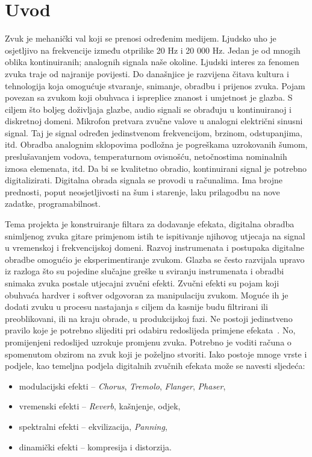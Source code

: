 \documentclass[conference]{IEEEtran}
\begin{document}
\section{Uvod}
Zvuk je mehanički val koji se prenosi određenim medijem. Ljudsko uho je osjetljivo na
frekvencije između otprilike 20 Hz i 20 000 Hz. Jedan je od mnogih oblika kontinuiranih;
analognih signala naše okoline. Ljudski interes za fenomen zvuka traje od najranije povijesti. Do
današnjice je razvijena čitava kultura i tehnologija koja omogućuje stvaranje, snimanje, obradbu
i prijenos zvuka. Pojam povezan sa zvukom koji obuhvaca i ispreplice znanost i umjetnost je glazba.
S ciljem što boljeg doživljaja glazbe, audio signali se obrađuju u kontinuiranoj i
diskretnoj domeni. Mikrofon pretvara zvučne valove u analogni električni sinusni signal. Taj je
signal određen jedinstvenom frekvencijom, brzinom, odstupanjima, itd. Obradba analognim
sklopovima podložna je pogreškama uzrokovanih šumom, preslušavanjem vodova,
temperaturnom ovisnošću, netočnostima nominalnih iznosa elemenata, itd. Da bi se kvalitetno
obradio, kontinuirani signal je potrebno digitalizirati. Digitalna obrada signala se provodi u
računalima. Ima brojne prednosti, poput neosjetljivosti na šum i starenje, laku prilagodbu na
nove zadatke, programabilnost.

Tema projekta je konstruiranje filtara za dodavanje efekata, digitalna obradba snimljenog zvuka
gitare primjenom istih te ispitivanje njihovog utjecaja na signal u vremenskoj i frekvencijskoj
domeni. Razvoj instrumenata i postupaka digitalne obradbe omogućio je eksperimentiranje
zvukom. Glazba se često razvijala upravo iz razloga što su pojedine slučajne greške u sviranju
instrumenata i obradbi snimaka zvuka postale utjecajni zvučni efekti. Zvučni efekti su pojam koji
obuhvaća hardver i softver odgovoran za manipulaciju zvukom. Moguće ih je dodati zvuku u
procesu nastajanja s ciljem da kasnije budu filtrirani ili preoblikovani, ili
na kraju obrade, u produkcijskoj fazi. Ne postoji jedinstveno pravilo koje je potrebno slijediti pri
odabiru redoslijeda primjene efekata~\cite{b1}. No, promijenjeni redoslijed uzrokuje promjenu zvuka.
Potrebno je voditi računa o spomenutom obzirom na zvuk koji je poželjno stvoriti. Iako postoje
mnoge vrste i podjele, kao temeljna podjela digitalnih zvučnih efekata
može se navesti sljedeća:

\begin{itemize}
	\item{modulacijski efekti – \textit{Chorus}, \textit{Tremolo}, \textit{Flanger}, \textit{Phaser},}
	\item{vremenski efekti – \textit{Reverb}, kašnjenje, odjek,}
	\item{spektralni efekti – ekvilizacija, \textit{Panning},}
	\item{dinamički efekti – kompresija i distorzija.}
\end{itemize}
\end{document}
